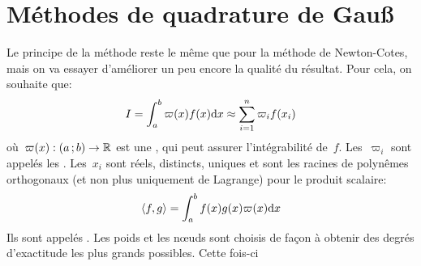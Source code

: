 \section{Méthodes de quadrature de Gauß} 
Le principe de la méthode reste le même que pour la méthode de Newton-Cotes, mais on va essayer d'améliorer un peu encore la qualité du résultat. Pour cela, on souhaite que: 
\begin{equation}
I=\int_a^b \varpi(x)f(x)\text{d} x \approx \sum_{i=1}^n \varpi_if(x_i)
\end{equation}
où~$\varpi(x): \mathopen{(}a\,;b\mathclose{)}\rightarrow\mathbb R$ est une , qui peut assurer l'intégrabilité de~$f$. Les~$\varpi_i$ sont appelés les . Les~$x_i$ sont réels, distincts, uniques et sont les racines de polynêmes orthogonaux (et non plus uniquement de Lagrange) pour le produit scalaire:
\begin{equation}
\left\langle f,g \right\rangle = \int_a^b f(x)g(x) \varpi(x) \text{d} x
\end{equation}
Ils sont appelés . Les poids et les nœuds sont choisis de façon à obtenir des degrés d'exactitude les plus grands possibles. Cette fois-ci  
